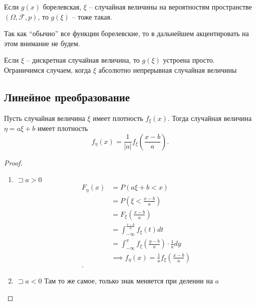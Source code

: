 \begin{theorem}
    Если $g(x)$ борелевская,  $\xi$ -- случайная величины на вероятностям пространстве  $\left( \Omega, \mathscr F, p \right) $, то $g\left( \xi \right) $ -- тоже такая.
\end{theorem}

\begin{note}
    Так как ``обычно'' все функции борелевские, то в дальнейшем акцентировать на этом внимание не будем.
\end{note}

\begin{note}
    Если $\xi$ -- дискретная случайная величина, то  $g(\xi)$ устроена просто. Ограничимся случаем, когда  $\xi$ абсолютно непрерывная случайная величины
\end{note}

\subsection{Линейное преобразование}

\begin{theorem}
    Пусть случайная величина $\xi$ имеет плотность  $f_\xi(x)$. Тогда случайная величина  $\eta = a\xi + b$ имеет плотность 
     \[
         f_\eta(x)  = \frac{1}{|a|}f_\xi\left( \frac{x-b}{a} \right)  
    .\] 
\end{theorem}
\begin{proof}
    \begin{enumerate}
        \item $\sqsupset a > 0$
            \begin{align*}
                F_\eta(x) &= P\left( a\xi + b < x \right)  \\
                          &= P\left( \xi<\frac{x-b}{a} \right) \\
                          &= F_\xi\left( \frac{x-b}{a} \right) \\
                          &= \int_{-\infty }^{\frac{x-b}{a}} f_\xi(t)dt \\
                          &= \int_{-\infty }^x f_\xi\left( \frac{y-b}{a} \right) \cdot \frac{1}{a}dy\\
                          &\implies f_\eta(x) = \frac{1}{a} f_\xi\left( \frac{x-b}{a} \right)  \\
            .\end{align*}
        \item $\sqsupset a < 0$
            Там то же самое, только знак меняется при делении на $a$
    \end{enumerate}
\end{proof}

